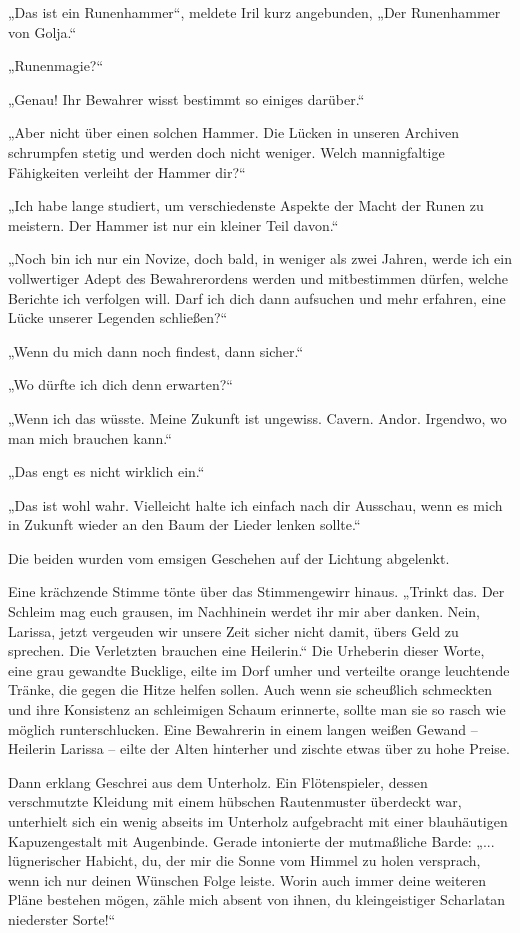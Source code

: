 „Das ist ein Runenhammer“, meldete Iril kurz angebunden, „Der Runenhammer von Golja.“

„Runenmagie?“

„Genau! Ihr Bewahrer wisst bestimmt so einiges darüber.“

„Aber nicht über einen solchen Hammer. Die Lücken in unseren Archiven schrumpfen stetig und werden doch nicht weniger. Welch mannigfaltige Fähigkeiten verleiht der Hammer dir?“

„Ich habe lange studiert, um verschiedenste Aspekte der Macht der Runen zu meistern. Der Hammer ist nur ein kleiner Teil davon.“

„Noch bin ich nur ein Novize, doch bald, in weniger als zwei Jahren, werde ich ein vollwertiger Adept des Bewahrerordens werden und mitbestimmen dürfen, welche Berichte ich verfolgen will. Darf ich dich dann aufsuchen und mehr erfahren, eine Lücke unserer Legenden schließen?“

„Wenn du mich dann noch findest, dann sicher.“

„Wo dürfte ich dich denn erwarten?“

„Wenn ich das wüsste. Meine Zukunft ist ungewiss. Cavern. Andor. Irgendwo, wo man mich brauchen kann.“

„Das engt es nicht wirklich ein.“

„Das ist wohl wahr. Vielleicht halte ich einfach nach dir Ausschau, wenn es mich in Zukunft wieder an den Baum der Lieder lenken sollte.“

Die beiden wurden vom emsigen Geschehen auf der Lichtung abgelenkt.

Eine krächzende Stimme tönte über das Stimmengewirr hinaus. „Trinkt das. Der Schleim mag euch grausen, im Nachhinein werdet ihr mir aber danken. Nein, Larissa, jetzt vergeuden wir unsere Zeit sicher nicht damit, übers Geld zu sprechen. Die Verletzten brauchen eine Heilerin.“ Die Urheberin dieser Worte, eine grau gewandte Bucklige, eilte im Dorf umher und verteilte orange leuchtende Tränke, die gegen die Hitze helfen sollen. Auch wenn sie scheußlich schmeckten und ihre Konsistenz an schleimigen Schaum erinnerte, sollte man sie so rasch wie möglich runterschlucken. Eine Bewahrerin in einem langen weißen Gewand – Heilerin Larissa – eilte der Alten hinterher und zischte etwas über zu hohe Preise.

Dann erklang Geschrei aus dem Unterholz. Ein Flötenspieler, dessen verschmutzte Kleidung mit einem hübschen Rautenmuster überdeckt war, unterhielt sich ein wenig abseits im Unterholz aufgebracht mit einer blauhäutigen Kapuzengestalt mit Augenbinde. Gerade intonierte der mutmaßliche Barde: „... lügnerischer Habicht, du, der mir die Sonne vom Himmel zu holen versprach, wenn ich nur deinen Wünschen Folge leiste. Worin auch immer deine weiteren Pläne bestehen mögen, zähle mich absent von ihnen, du kleingeistiger Scharlatan niederster Sorte!“

